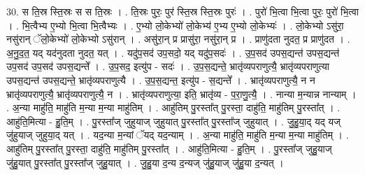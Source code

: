 \documentclass[17pt]{extarticle}
\begin{document}
30. स ति॒स्र स्ति॒स्रः स स ति॒स्रः । . ति॒स्रः पुरः॒ पुर॑ स्ति॒स्र स्ति॒स्रः पुरः॑ । . पुरो॑ भि॒त्वा भि॒त्वा पुरः॒ पुरो॑ भि॒त्वा । . भि॒त्वैभ्य ए॒भ्यो भि॒त्वा भि॒त्वैभ्यः । . ए॒भ्यो लो॒केभ्यो॑ लो॒केभ्य॑ ए॒भ्य ए॒भ्यो लो॒केभ्यः॑ । . लो॒केभ्यो ऽसु॑रा॒ नसु॑रान् ॅलो॒केभ्यो॑ लो॒केभ्यो ऽसु॑रान् । . असु॑रा॒न् प्र प्रासु॑रा॒ नसु॑रा॒न् प्र । . प्राणु॑दता नुदत॒ प्र प्राणु॑दत । . अ॒नु॒द॒त॒ यद् यद॑नुदता नुदत॒ यत् । . यदु॑प॒सद॑ उप॒सदो॒ यद् यदु॑प॒सदः॑ । . उ॒प॒सद॑ उपस॒द्यन्त॑ उपस॒द्यन्त॑ उप॒सद॑ उप॒सद॑ उपस॒द्यन्ते᳚ । . उ॒प॒सद॒ इत्यु॑प - सदः॑ । . उ॒प॒स॒द्यन्ते॒ भ्रातृ॑व्यपराणुत्यै॒ भ्रातृ॑व्यपराणुत्या उपस॒द्यन्त॑ उपस॒द्यन्ते॒ भ्रातृ॑व्यपराणुत्यै । . उ॒प॒स॒द्यन्त॒ इत्यु॑प - स॒द्यन्ते᳚ । . भ्रातृ॑व्यपराणुत्यै॒ न न भ्रातृ॑व्यपराणुत्यै॒ भ्रातृ॑व्यपराणुत्यै॒ न । . भ्रातृ॑व्यपराणुत्या॒ इति॒ भ्रातृ॑व्य - प॒रा॒णु॒त्यै॒ । . नान्या म॒न्यान्न नान्याम् । . अ॒न्या माहु॑ति॒ माहु॑ति म॒न्या म॒न्या माहु॑तिम् । . आहु॑तिम् पु॒रस्ता᳚त् पु॒रस्ता॒ दाहु॑ति॒ माहु॑तिम् पु॒रस्ता᳚त् । . आहु॑ति॒मित्या - हु॒ति॒म् । . पु॒रस्ता᳚ज् जुहुयाज् जुहुयात् पु॒रस्ता᳚त् पु॒रस्ता᳚ज् जुहुयात् । . जु॒हु॒या॒द् यद् यज् जु॑हुयाज् जुहुया॒द् यत् । . यद॒न्या म॒न्यां ॅयद् यद॒न्याम् । . अ॒न्या माहु॑ति॒ माहु॑ति म॒न्या म॒न्या माहु॑तिम् । . आहु॑तिम् पु॒रस्ता᳚त् पु॒रस्ता॒ दाहु॑ति॒ माहु॑तिम् पु॒रस्ता᳚त् । . आहु॑ति॒मित्या - हु॒ति॒म् । . पु॒रस्ता᳚ज् जुहु॒याज् जु॑हु॒यात् पु॒रस्ता᳚त् पु॒रस्ता᳚ज् जुहु॒यात् । . जु॒हु॒या द॒न्य द॒न्यज् जु॑हु॒याज् जु॑हु॒या द॒न्यत् । \newline
\end{document}
